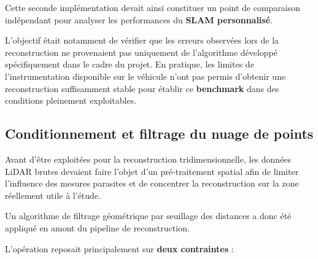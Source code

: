 \documentclass[12pt,a4paper,oneside]{report}
\begin{document}
\hspace*{1cm}Cette seconde implémentation devait ainsi constituer un point de comparaison indépendant pour analyser les performances du \textbf{SLAM personnalisé}. \vspace{0.05cm}

\hspace*{0.5cm}L'objectif était notamment de vérifier que les erreurs observées lors de la reconstruction ne provenaient pas uniquement de l'algorithme développé spécifiquement dans le cadre du projet. En pratique, les limites de l'instrumentation disponible sur le véhicule n'ont pas permis d'obtenir une reconstruction suffisamment stable pour établir ce\textbf{ benchmark }dans des conditions pleinement exploitables.

\newpage

\subsection{Conditionnement et filtrage du nuage de points}

\vspace{1.5cm}

\hspace*{1cm}Avant d'être exploitées pour la reconstruction tridimensionnelle, les données LiDAR brutes devaient faire l'objet d'un pré-traitement spatial afin de limiter l'influence des mesures parasites et de concentrer la reconstruction sur la zone réellement utile à l'étude.\vspace{0.2cm}

\hspace*{1cm}Un algorithme de filtrage géométrique par seuillage des distances a donc été appliqué en amont du pipeline de reconstruction. \vspace{0.1cm}

\hspace*{0.5cm}L'opération reposait principalement sur \textbf{deux contraintes} :\vspace{0.5cm}
\end{document}
